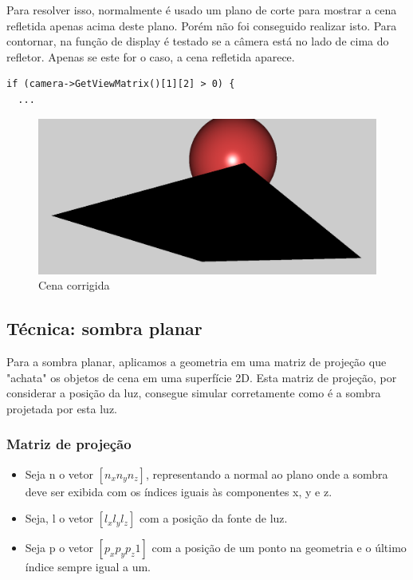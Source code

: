 \documentclass[11pt, a4paper]{article}
\begin{document}
Para resolver isso, normalmente é usado um plano de corte para mostrar a cena refletida apenas
acima deste plano. Porém não foi conseguido realizar isto. Para contornar, na função
de display é testado se a câmera está no lado de cima do
refletor.
Apenas se este for o caso, a cena refletida aparece.

\begin{verbatim}
if (camera->GetViewMatrix()[1][2] > 0) {
  ...
\end{verbatim}

\begin{figure}[H]
  \begin{center}
  \includegraphics[width=0.8\linewidth]{with-condition.png}
  \caption{Cena corrigida}
  \label{fig:vaz}
  \end{center}
\end{figure}


\subsection {Técnica: sombra planar}

Para a sombra planar, aplicamos a geometria em uma matriz de projeção que "achata"
os objetos de cena em uma superfície 2D. Esta matriz de projeção, por considerar a posição da luz,
consegue simular corretamente como é a sombra projetada por esta luz.

\subsubsection{Matriz de projeção}

\begin{itemize}
\item Seja n o vetor $[n_x n_y n_z]$, representando a normal ao plano onde a sombra deve
ser exibida com os índices iguais às componentes x, y e z.

\item Seja, l o vetor $[l_x l_y l_z ]$ com a posição da fonte de luz.

\item Seja p o vetor $[p_x p_y p_z 1]$ com a posição de um ponto na geometria e
o último índice sempre igual a um.

\end{itemize}
\end{document}
